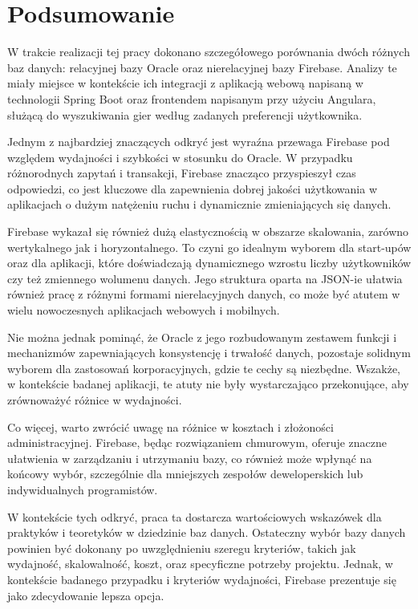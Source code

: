 \chapter*{Podsumowanie}

W trakcie realizacji tej pracy dokonano szczegółowego porównania dwóch różnych baz danych: relacyjnej bazy Oracle oraz nierelacyjnej bazy Firebase. Analizy te miały miejsce w kontekście ich integracji z aplikacją webową napisaną w technologii Spring Boot oraz frontendem napisanym przy użyciu Angulara, służącą do wyszukiwania gier według zadanych preferencji użytkownika.

Jednym z najbardziej znaczących odkryć jest wyraźna przewaga Firebase pod względem wydajności i szybkości w stosunku do Oracle. W przypadku różnorodnych zapytań i transakcji, Firebase znacząco przyspieszył czas odpowiedzi, co jest kluczowe dla zapewnienia dobrej jakości użytkowania w aplikacjach o dużym natężeniu ruchu i dynamicznie zmieniających się danych.

Firebase wykazał się również dużą elastycznością w obszarze skalowania, zarówno wertykalnego jak i horyzontalnego. To czyni go idealnym wyborem dla start-upów oraz dla aplikacji, które doświadczają dynamicznego wzrostu liczby użytkowników czy też zmiennego wolumenu danych. Jego struktura oparta na JSON-ie ułatwia również pracę z różnymi formami nierelacyjnych danych, co może być atutem w wielu nowoczesnych aplikacjach webowych i mobilnych.

Nie można jednak pominąć, że Oracle z jego rozbudowanym zestawem funkcji i mechanizmów zapewniających konsystencję i trwałość danych, pozostaje solidnym wyborem dla zastosowań korporacyjnych, gdzie te cechy są niezbędne. Wszakże, w kontekście badanej aplikacji, te atuty nie były wystarczająco przekonujące, aby zrównoważyć różnice w wydajności.

Co więcej, warto zwrócić uwagę na różnice w kosztach i złożoności administracyjnej. Firebase, będąc rozwiązaniem chmurowym, oferuje znaczne ułatwienia w zarządzaniu i utrzymaniu bazy, co również może wpłynąć na końcowy wybór, szczególnie dla mniejszych zespołów deweloperskich lub indywidualnych programistów.

W kontekście tych odkryć, praca ta dostarcza wartościowych wskazówek dla praktyków i teoretyków w dziedzinie baz danych. Ostateczny wybór bazy danych powinien być dokonany po uwzględnieniu szeregu kryteriów, takich jak wydajność, skalowalność, koszt, oraz specyficzne potrzeby projektu. Jednak, w kontekście badanego przypadku i kryteriów wydajności, Firebase prezentuje się jako zdecydowanie lepsza opcja.